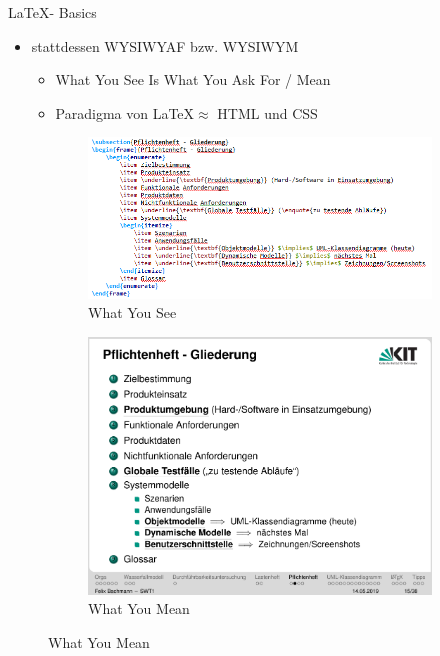 \documentclass[18pt]{beamer}
\begin{document}
\begin{frame}{\LaTeX - Basics}
	\begin{itemize}
		\item stattdessen WYSIWYAF bzw. WYSIWYM
		\begin{itemize}
			\item What You See Is What You Ask For / Mean
			\item Paradigma von \LaTeX $\approx$ HTML und CSS
		\end{itemize}
	\end{itemize}
	\begin{figure}
		\begin{subfigure}{0.55\textwidth}
			\centering
			\caption{\small What You See}
			\includegraphics[scale=0.36]{pics/tut1/wysiwym_raw.png}
		\end{subfigure}%
		\begin{subfigure}{0.45\textwidth}
			\centering
			\caption{\small What You Mean}
			\includegraphics[scale=0.2]{pics/tut1/wysiwym.png}
		\end{subfigure}
	\end{figure}
\end{frame}
\end{document}
